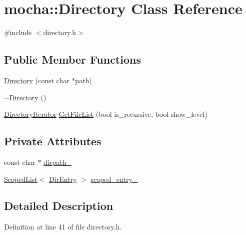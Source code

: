 \hypertarget{classmocha_1_1_directory}{
\section{mocha::Directory Class Reference}
\label{classmocha_1_1_directory}
}


{\ttfamily \#include $<$directory.h$>$}

\subsection*{Public Member Functions}
\begin{DoxyCompactItemize}
\item 
\hyperlink{classmocha_1_1_directory_a8ab64ab473c53ce7efe47c550ae808e9}{Directory} (const char $\ast$path)
\item 
\hyperlink{classmocha_1_1_directory_aa65b5b51baac31c89e41cda4fe7ece60}{$\sim$Directory} ()
\item 
\hyperlink{classmocha_1_1_directory_iterator}{DirectoryIterator} \hyperlink{classmocha_1_1_directory_a2002487d0073118d2b6be6e4820b8bf1}{GetFileList} (bool is\_\-recursive, bool show\_\-level)
\end{DoxyCompactItemize}
\subsection*{Private Attributes}
\begin{DoxyCompactItemize}
\item 
const char $\ast$ \hyperlink{classmocha_1_1_directory_a3cd4008d4a33371aa4f56fc92b2e7917}{dirpath\_\-}
\item 
\hyperlink{classmocha_1_1_scoped_list}{ScopedList}$<$ \hyperlink{classmocha_1_1_dir_entry}{DirEntry} $>$ \hyperlink{classmocha_1_1_directory_a6ca71b15d6b5344e0f999d877810d626}{scoped\_\-entry\_\-}
\end{DoxyCompactItemize}


\subsection{Detailed Description}


Definition at line 41 of file directory.h.



